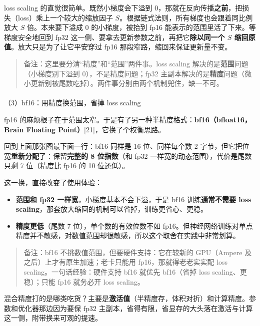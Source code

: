 \documentclass[
  chinese,
]{ctexart}
\makeatletter
\let\oldparagraph\paragraph
\renewcommand{\paragraph}{
    \@ifstar
      \xxxParagraphStar
      \xxxParagraphNoStar
  }
\newcommand{\xxxParagraphStar}[1]{\oldparagraph*{#1}\mbox{}}
\newcommand{\xxxParagraphNoStar}[1]{\oldparagraph{#1}\mbox{}}
\providecommand{\tightlist}{%
  \setlength{\itemsep}{0pt}\setlength{\parskip}{0pt}}
\makeatother
\begin{document}
loss scaling 的直觉很简单。既然小梯度会下溢到
0，那就在反向传播\textbf{之前}，把损失（loss）乘上一个较大的缩放因子
\(S\)。根据链式法则，所有梯度也会跟着同比例放大 \(S\) 倍。本来要下溢成 0
的小梯度，被抬到 fp16 能表示的范围里活了下来。等梯度安全地回到 fp32
这一侧、要拿去更新参数之前，再把它\textbf{除以同一个 \(S\)
缩回原值}。放大只是为了让它平安穿过 fp16
那段窄路，缩回来保证更新量不变。

\begin{quote}
备注：这里要分清``精度''和``范围''两件事。loss scaling
解决的是\textbf{范围}问题（小梯度别下溢到 0），不是精度问题；fp32
主副本解决的是\textbf{精度}问题（微小更新别被尾数吃掉）。两件事分别由两个机制兜住，缺一不可。
\end{quote}

\paragraph{（3）bf16：用精度换范围，省掉 loss
scaling}\label{bf16ux7528ux7cbeux5ea6ux6362ux8303ux56f4ux7701ux6389-loss-scaling}

fp16
的麻烦根子在于范围太窄。于是有了另一种半精度格式：\textbf{bf16（bfloat16，Brain
Floating Point）}{[}21{]}，它换了个权衡思路。

回到上面那张图最下面一行：bf16 同样是 16 位、同样每个数 2
字节，但它把位宽\textbf{重新分配}了：保留\textbf{完整的 8 位指数}（和
fp32 一样宽的动态范围），代价是尾数只剩 7 位（精度比 fp16 的 10
位还低）。

这一换，直接改变了使用体验：

\begin{itemize}
\tightlist
\item
  \textbf{范围和 fp32 一样宽}，小梯度基本不会下溢，于是 bf16
  训练\textbf{通常不需要 loss
  scaling}，那套放大缩回的机制可以省掉，训练更省心、更稳。
\item
  \textbf{精度更低}（尾数 7 位），单个数的有效位数不如
  fp16。但神经网络训练对单点精度并不敏感，对数值范围却很敏感，所以这个取舍在实践中非常划算。
\end{itemize}

\begin{quote}
备注：bf16 不挑数值范围，但要硬件支持：它在较新的 GPU（Ampere
及之后）上才有原生加速；老卡只能用 fp16，那就得老老实实配 loss
scaling。一句话经验：硬件支持 bf16 就优先 bf16（省掉 loss
scaling、更稳）；只能 fp16 就务必开 loss scaling。
\end{quote}

混合精度打的是哪类吃货？主要是\textbf{激活值}（半精度存，体积对折）和计算精度。参数和优化器那边因为要保
fp32
主副本，省得有限，省显存的大头落在激活与计算这一侧，附带换来可观的提速。
\end{document}
